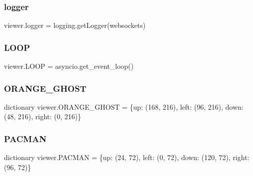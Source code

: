 \mbox{\label{namespaceviewer_a7a420ec0e1bb58775b845f32c4674daa}} 
\subsubsection{\texorpdfstring{logger}{logger}}
{\footnotesize\ttfamily viewer.\+logger = logging.\+get\+Logger(\textquotesingle{}websockets\textquotesingle{})}

\mbox{\label{namespaceviewer_a660bbde5965f91becad747868e409c6c}} 
\subsubsection{\texorpdfstring{L\+O\+OP}{LOOP}}
{\footnotesize\ttfamily viewer.\+L\+O\+OP = asyncio.\+get\+\_\+event\+\_\+loop()}

\mbox{\label{namespaceviewer_a8dd3905e87c1c9dfdb99de2c99d24bd8}} 
\subsubsection{\texorpdfstring{O\+R\+A\+N\+G\+E\+\_\+\+G\+H\+O\+ST}{ORANGE\_GHOST}}
{\footnotesize\ttfamily dictionary viewer.\+O\+R\+A\+N\+G\+E\+\_\+\+G\+H\+O\+ST = \{\textquotesingle{}up\textquotesingle{}\+: (168, 216), \textquotesingle{}left\textquotesingle{}\+: (96, 216), \textquotesingle{}down\textquotesingle{}\+: (48, 216), \textquotesingle{}right\textquotesingle{}\+: (0, 216)\}}

\mbox{\label{namespaceviewer_a3bd33705051ffc40b5bfd35e243ae0ac}} 
\subsubsection{\texorpdfstring{P\+A\+C\+M\+AN}{PACMAN}}
{\footnotesize\ttfamily dictionary viewer.\+P\+A\+C\+M\+AN = \{\textquotesingle{}up\textquotesingle{}\+: (24, 72), \textquotesingle{}left\textquotesingle{}\+: (0, 72), \textquotesingle{}down\textquotesingle{}\+: (120, 72), \textquotesingle{}right\textquotesingle{}\+: (96, 72)\}}

